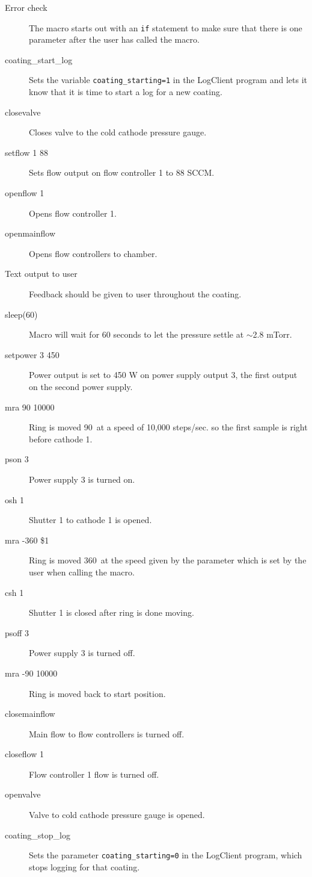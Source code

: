 \begin{description}
  \item[Error check] The macro starts out with an \verb|if| statement to make sure that there is one parameter after the user has called the macro.
  \item[coating\_start\_log] Sets the variable \verb|coating_starting=1| in the LogClient program and lets it know that it is time to start a log for a new coating.
  \item[closevalve] Closes valve to the cold cathode pressure gauge.
  \item[setflow 1 88] Sets flow output on flow controller 1 to 88 SCCM.
  \item[openflow 1] Opens flow controller 1.
  \item[openmainflow] Opens flow controllers to chamber.
  \item[Text output to user] Feedback should be given to user throughout the coating.
  \item[sleep(60)] Macro will wait for 60 seconds to let the pressure settle at $\sim$2.8 mTorr.
  \item[setpower 3 450] Power output is set to 450 W on power supply output 3, the first output on the second power supply.
  \item[mra 90 10000] Ring is moved 90\degr\ at a speed of 10,000 steps/sec. so the first sample is right before cathode 1.
  \item[pson 3] Power supply 3 is turned on.
  \item[osh 1] Shutter 1 to cathode 1 is opened.
  \item[mra -360 \$1] Ring is moved 360\degr\ at the speed given by the parameter which is set by the user when calling the macro.
  \item[csh 1] Shutter 1 is closed after ring is done moving.
  \item[psoff 3] Power supply 3 is turned off.
  \item[mra -90 10000] Ring is moved back to start position.
  \item[closemainflow] Main flow to flow controllers is turned off.
  \item[closeflow 1] Flow controller 1 flow is turned off.
  \item[openvalve] Valve to cold cathode pressure gauge is opened.
  \item[coating\_stop\_log] Sets the parameter \verb|coating_starting=0| in the LogClient program, which stops logging for that coating.
\end{description}


